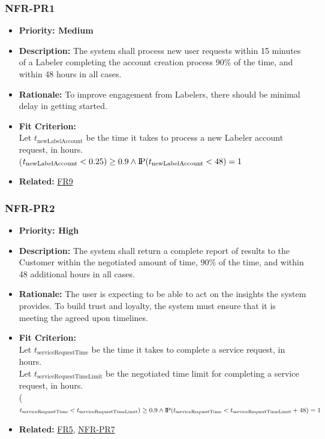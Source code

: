\documentclass[12pt]{article}
\newcommand{\probP}{\text{I\kern-0.15em P}}
\begin{document}
\subsubsection*{NFR-PR1}
\label{sec:PR1}
\begin{itemize}
  \item \textbf{Priority: Medium}
  \item \textbf{Description:} The system shall process new user requests within 15 minutes of a Labeler  completing the account creation process 90\% of the time, and within 48 hours in all cases. 
  \item \textbf{Rationale:} To improve engagement from Labelers, there should be minimal delay in getting started.
  \item \textbf{Fit Criterion:}\\ Let $t_{\text{newLabelAccount}}$ be the time it takes to process a new Labeler account request, in hours.\\ \probP($t_{\text{newLabelAccount}} < 0.25) \geq 0.9 \wedge \probP(t_{\text{newLabelAccount}} < 48) = 1 $
  \item \textbf{Related:} \hyperref[sec:FR9]{FR9}
\end{itemize}

\subsubsection*{NFR-PR2}
\label{sec:PR2}
\begin{itemize}
  \item \textbf{Priority: High}
  \item \textbf{Description:} The system shall return a complete report of results to the Customer within the negotiated amount of time, 90\% of the time, and within 48 additional hours in all cases.
  \item \textbf{Rationale:} The user is expecting to be able to act on the insights the system provides. To build trust and loyalty, the system must ensure that it is meeting the agreed upon timelines.
  \item \textbf{Fit Criterion:}\\ Let $t_{\text{serviceRequestTime}}$ be the time it takes to complete a service request, in hours.\\
  Let $t_{\text{serviceRequestTimeLimit}}$ be the negotiated time limit for completing a service request, in hours.\\ \probP($t_{\text{serviceRequestTime}} < t_{\text{serviceRequestTimeLimit}}) \geq 0.9\\ \wedge \probP(t_{\text{serviceRequestTime}} < t_{\text{serviceRequestTimeLimit}}+48) = 1 $
  \item \textbf{Related:} \hyperref[sec:FR5]{FR5},  \hyperref[sec:PR7]{NFR-PR7}
\end{itemize}
\end{document}
